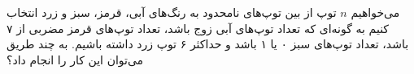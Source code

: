 \p
     می‌خواهیم 
	 $n$ 
	 توپ از بین توپ‌های نامحدود به رنگ‌های آبی، قرمز، سبز و زرد انتخاب کنیم به گونه‌ای که تعداد توپ‌های آبی زوج باشد،
	 تعداد توپ‌‌های قرمز مضربی از ۷ باشد، تعداد توپ‌های سبز ۰ یا ۱ باشد و حداکثر ۶ توپ زرد داشته باشیم.
	  به چند طریق می‌توان این کار را انجام داد؟
